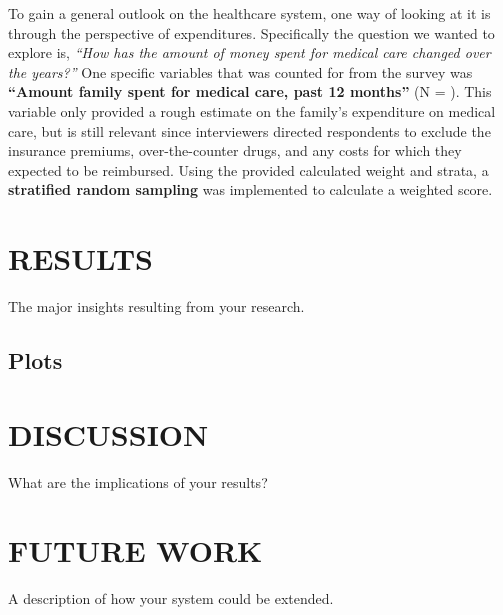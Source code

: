 \documentclass[10pt,]{article}
\begin{document}
To gain a general outlook on the healthcare system, one way of looking
at it is through the perspective of expenditures. Specifically the
question we wanted to explore is, \emph{``How has the amount of money
spent for medical care changed over the years?''} One specific variables
that was counted for from the survey was \textbf{``Amount family spent
for medical care, past 12 months''} (N = ). This variable only provided
a rough estimate on the family's expenditure on medical care, but is
still relevant since interviewers directed respondents to exclude the
insurance premiums, over-the-counter drugs, and any costs for which they
expected to be reimbursed. Using the provided calculated weight and
strata, a \textbf{stratified random sampling} was implemented to
calculate a weighted score.

\section{RESULTS}\label{results}

The major insights resulting from your research.

\subsection{\texorpdfstring{\textbf{Plots}}{Plots}}\label{plots}

\section{DISCUSSION}\label{discussion}

What are the implications of your results?

\section{FUTURE WORK}\label{future-work}

A description of how your system could be extended.
\newpage
\singlespacing 

\end{document}
